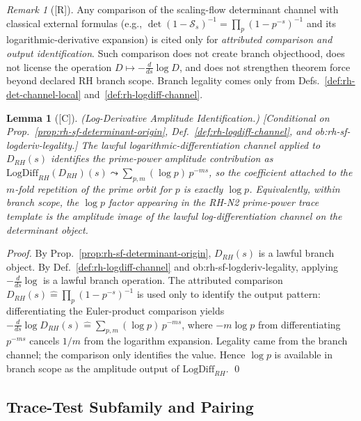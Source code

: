 \documentclass[12pt,oneside]{amsbook}
\theoremstyle{plain}
\newtheorem{lemma}[theorem]{Lemma}
\theoremstyle{definition}
\theoremstyle{remark}
\newtheorem{remark}[theorem]{Remark}
\newcommand{\status}[1]{\textup{[#1]}}
\begin{document}
\begin{remark}[\status{R}]\label{rem:rh-logdiff-attribution-discipline}
Any comparison of the scaling-flow determinant channel with classical
external formulas (e.g., $\det(1-\mathcal{S}_s)^{-1} = \prod_p
(1-p^{-s})^{-1}$ and its logarithmic-derivative expansion) is cited
only for \emph{attributed comparison and output identification}.
Such comparison does not create branch objecthood, does not license
the operation $D \mapsto -\tfrac{d}{ds}\log D$, and does not
strengthen theorem force beyond declared RH branch scope. Branch
legality comes only from Defs.~\ref{def:rh-det-channel-local}
and~\ref{def:rh-logdiff-channel}.
\end{remark}

\begin{lemma}[\status{C}]\label{lem:rh-sf-logdiff-amplitude}
\textup{(Log-Derivative Amplitude Identification.)}
\textup{[Conditional on Prop.~\ref{prop:rh-sf-determinant-origin},
Def.~\ref{def:rh-logdiff-channel}, and ob:rh-sf-logderiv-legality.]}
The lawful logarithmic-differentiation channel applied to
$D_{RH}(s)$ identifies the prime-power amplitude contribution as
$\mathrm{LogDiff}_{RH}(D_{RH})(s) \leadsto \sum_{p,m} (\log p)\,
p^{-ms}$, so the coefficient attached to the $m$-fold repetition of
the prime orbit for $p$ is exactly $\log p$. Equivalently, within
branch scope, the $\log p$ factor appearing in the RH-N2 prime-power
trace template is the amplitude image of the lawful
log-differentiation channel on the determinant object.
\end{lemma}

\begin{proof}
By Prop.~\ref{prop:rh-sf-determinant-origin}, $D_{RH}(s)$ is a lawful
branch object. By Def.~\ref{def:rh-logdiff-channel} and
ob:rh-sf-logderiv-legality, applying $-\tfrac{d}{ds}\log$ is a
lawful branch operation. The attributed comparison
$D_{RH}(s) \widehat{=} \prod_p(1-p^{-s})^{-1}$ is used only to
identify the output pattern: differentiating the Euler-product
comparison yields $-\tfrac{d}{ds}\log D_{RH}(s) \widehat{=}
\sum_{p,m}(\log p)\,p^{-ms}$, where $-m\log p$ from differentiating
$p^{-ms}$ cancels $1/m$ from the logarithm expansion. Legality came
from the branch channel; the comparison only identifies the value.
Hence $\log p$ is available in branch scope as the amplitude output
of $\mathrm{LogDiff}_{RH}$. \qed
\end{proof}

\subsection{Trace-Test Subfamily and Pairing}
\end{document}
